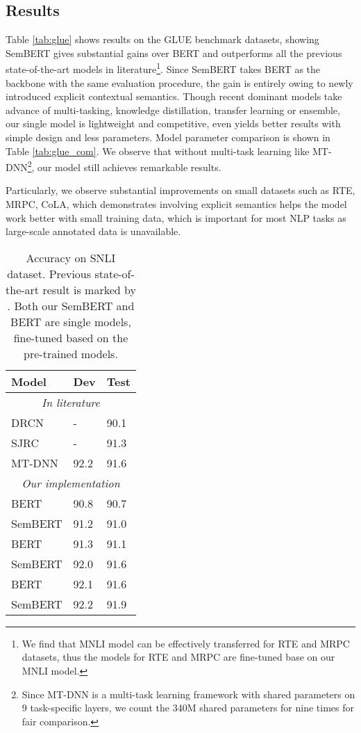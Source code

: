 \documentclass[letterpaper]{article} \usepackage{aaai20}  \usepackage{times}  \usepackage{helvet} \usepackage{courier}  \usepackage[hyphens]{url}  \usepackage{graphicx} \urlstyle{rm} \def\UrlFont{\rm}  \usepackage{graphicx}  \frenchspacing  \usepackage{amssymb}
\begin{document}
\subsection{Results} 
Table \ref{tab:glue} shows results on the GLUE benchmark datasets, showing SemBERT gives substantial gains over BERT and outperforms all the previous state-of-the-art models in literature\footnote{We find that MNLI model can be effectively transferred for RTE and MRPC datasets, thus the models for RTE and MRPC are fine-tuned base on our MNLI model.}. Since SemBERT takes BERT as the backbone with the same evaluation procedure, the gain is entirely owing to newly introduced explicit contextual semantics. Though recent dominant models take advance of multi-tasking, knowledge distillation, transfer learning or ensemble, our single model is lightweight and competitive, even yields better results with simple design and less parameters. Model parameter comparison is shown in Table \ref{tab:glue_com}.  We observe that without multi-task learning like MT-DNN\footnote[8]{Since MT-DNN is a multi-task learning framework with shared parameters on 9 task-specific layers, we count the 340M shared parameters for nine times for fair comparison.}, our model still achieves remarkable results. 

Particularly, we observe substantial improvements on small datasets such as RTE, MRPC, CoLA, which demonstrates involving explicit semantics helps the model work better with small training data, which is important for most NLP tasks as large-scale annotated data is unavailable. 


\begin{table}
		\resizebox{\linewidth}{!}
	{
	\begin{tabular}{p{5cm} p{1cm} p{1cm}}
		\hline
		
		\hline
		\textbf{Model} &  \textbf{Dev} & \textbf{Test}   \\ 
		\hline
		\multicolumn{3}{c}{\emph{In literature}} \\
		DRCN \cite{kim2018semantic} &- & 90.1\\
		SJRC \cite{zhang2019explicit} & - & 91.3 \\
		MT-DNN \cite{liu2019multi} &92.2 & 91.6\\
		\hline
		\multicolumn{3}{c}{\emph{Our implementation}} \\
		BERT & 90.8 & 90.7\\
		SemBERT & 91.2 & 91.0 \\
		\hdashline
		BERT  & 91.3  & 91.1  \\
		SemBERT & 92.0  & 91.6 \\
		\hdashline
		BERT & 92.1 & 91.6 \\
		SemBERT & 92.2 & 91.9 \\ 
		\hline
		
		\hline
	\end{tabular}
}
	{
		\caption{\label{tab:snli} Accuracy on SNLI dataset. Previous state-of-the-art result is marked by . Both our SemBERT and BERT are single models, fine-tuned based on the pre-trained models.} } 
	
\end{table}
\end{document}
